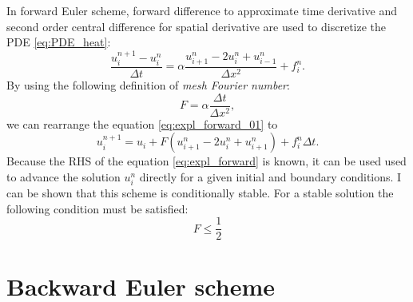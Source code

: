 \documentclass[a4paper,11pt]{article}
\begin{document}
In forward Euler scheme, forward difference to approximate time derivative and second order
central difference for spatial derivative are used to discretize the PDE \eqref{eq:PDE_heat}:
\begin{equation}
\frac{u_{i}^{n+1} - u_{i}^{n}}{\Delta t} = \alpha \frac{u_{i+1}^{n} -2u_{i}^{n} + u_{i-1}^{n}}{\Delta x^2} + f_{i}^{n}.
\label{eq:expl_forward_01}
\end{equation}
%
By using the following definition of \textit{mesh Fourier number}:
%
\begin{equation}
F = \alpha \frac{\Delta t}{\Delta x^2},
\end{equation}
%
we can rearrange the equation \eqref{eq:expl_forward_01} to
%
\begin{equation}
u_{i}^{n+1} = u_{i} + F\left( u_{i+1}^{n} - 2u_{i}^{n} + u_{i+1}^{n} \right) +
f_{i}^{n}\Delta t.
\label{eq:expl_forward}
\end{equation}
%
Because the RHS of the equation \eqref{eq:expl_forward} is known, it can be used used to advance
the solution $u^{n}_{i}$ directly for a given initial and boundary conditions.
I can be shown that this scheme is conditionally stable. For a stable solution the following
condition must be satisfied:
\begin{equation}
F \leq \frac{1}{2}
\end{equation}


\section{Backward Euler scheme}
\end{document}
